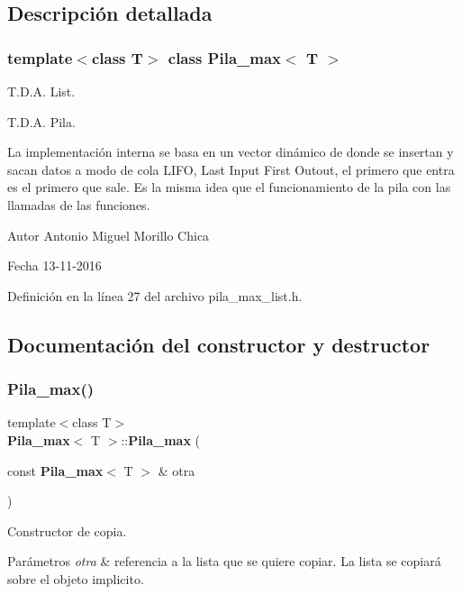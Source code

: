\subsection{Descripción detallada}
\subsubsection*{template$<$class T$>$\newline
class Pila\+\_\+max$<$ T $>$}

T.\+D.\+A. List. 

T.\+D.\+A. Pila.

La implementación interna se basa en un vector dinámico de donde se insertan y sacan datos a modo de cola L\+I\+FO, Last Input First Outout, el primero que entra es el primero que sale. Es la misma idea que el funcionamiento de la pila con las llamadas de las funciones.

\begin{DoxyAuthor}{Autor}
Antonio Miguel Morillo Chica 
\end{DoxyAuthor}
\begin{DoxyDate}{Fecha}
13-\/11-\/2016 
\end{DoxyDate}


Definición en la línea 27 del archivo pila\+\_\+max\+\_\+list.\+h.



\subsection{Documentación del constructor y destructor}
\label{classPila__max_ac5660591f59bd281a4d0df416e1f76d0} 
\subsubsection{Pila\+\_\+max()}
{\footnotesize\ttfamily template$<$class T$>$ \\
{\bf Pila\+\_\+max}$<$ T $>$\+::{\bf Pila\+\_\+max} (\begin{DoxyParamCaption}\item[{const {\bf Pila\+\_\+max}$<$ T $>$ \&}]{otra }\end{DoxyParamCaption})}



Constructor de copia. 


\begin{DoxyParams}{Parámetros}
{\em otra} & referencia a la lista que se quiere copiar. La lista se copiará sobre el objeto implicito. \\
\hline
\end{DoxyParams}


